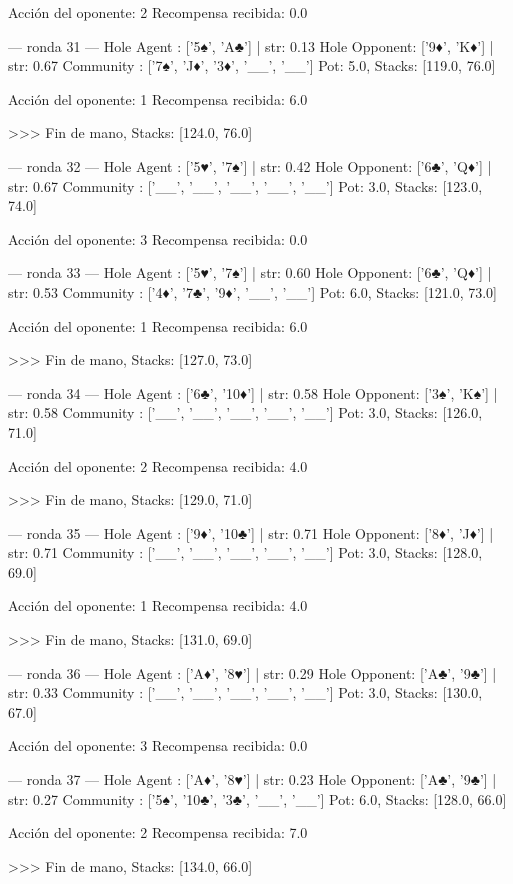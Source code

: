Acción del oponente: 2
Recompensa recibida: 0.0

--- ronda 31 ---
Hole Agent : ['5♠', 'A♣'] | str: 0.13
Hole Opponent: ['9♦', 'K♦'] | str: 0.67
Community  : ['7♠', 'J♦', '3♦', '__', '__']
Pot: 5.0, Stacks: [119.0, 76.0]

Acción del oponente: 1
Recompensa recibida: 6.0

>>> Fin de mano, Stacks: [124.0, 76.0]


--- ronda 32 ---
Hole Agent : ['5♥', '7♠'] | str: 0.42
Hole Opponent: ['6♣', 'Q♦'] | str: 0.67
Community  : ['__', '__', '__', '__', '__']
Pot: 3.0, Stacks: [123.0, 74.0]

Acción del oponente: 3
Recompensa recibida: 0.0

--- ronda 33 ---
Hole Agent : ['5♥', '7♠'] | str: 0.60
Hole Opponent: ['6♣', 'Q♦'] | str: 0.53
Community  : ['4♦', '7♣', '9♦', '__', '__']
Pot: 6.0, Stacks: [121.0, 73.0]

Acción del oponente: 1
Recompensa recibida: 6.0

>>> Fin de mano, Stacks: [127.0, 73.0]


--- ronda 34 ---
Hole Agent : ['6♣', '10♦'] | str: 0.58
Hole Opponent: ['3♠', 'K♠'] | str: 0.58
Community  : ['__', '__', '__', '__', '__']
Pot: 3.0, Stacks: [126.0, 71.0]

Acción del oponente: 2
Recompensa recibida: 4.0

>>> Fin de mano, Stacks: [129.0, 71.0]


--- ronda 35 ---
Hole Agent : ['9♦', '10♣'] | str: 0.71
Hole Opponent: ['8♦', 'J♦'] | str: 0.71
Community  : ['__', '__', '__', '__', '__']
Pot: 3.0, Stacks: [128.0, 69.0]

Acción del oponente: 1
Recompensa recibida: 4.0

>>> Fin de mano, Stacks: [131.0, 69.0]


--- ronda 36 ---
Hole Agent : ['A♦', '8♥'] | str: 0.29
Hole Opponent: ['A♣', '9♣'] | str: 0.33
Community  : ['__', '__', '__', '__', '__']
Pot: 3.0, Stacks: [130.0, 67.0]

Acción del oponente: 3
Recompensa recibida: 0.0

--- ronda 37 ---
Hole Agent : ['A♦', '8♥'] | str: 0.23
Hole Opponent: ['A♣', '9♣'] | str: 0.27
Community  : ['5♠', '10♣', '3♣', '__', '__']
Pot: 6.0, Stacks: [128.0, 66.0]

Acción del oponente: 2
Recompensa recibida: 7.0

>>> Fin de mano, Stacks: [134.0, 66.0]


